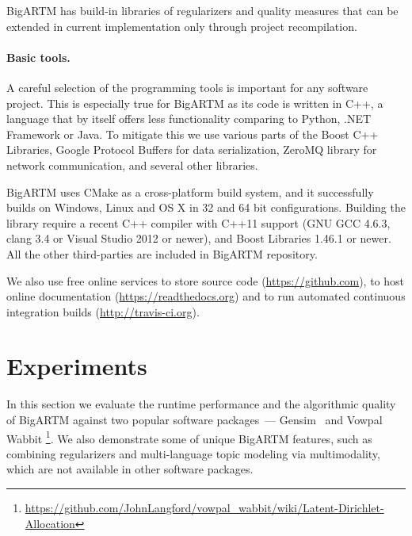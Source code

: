 \documentclass[russian]{llncs}
\begin{document}
BigARTM has build-in libraries of regularizers and quality measures
that can be extended in current implementation only through project recompilation.

\paragraph{Basic tools.}
A careful selection of the programming tools is important for any software project.
This is especially true for BigARTM as its code is written in C++,
a language that by itself offers less functionality comparing to Python, .NET Framework or Java.
To mitigate this we use
various parts of the Boost C++ Libraries,
Google Protocol Buffers for data serialization,
ZeroMQ library for network communication,
and several other libraries.

BigARTM uses CMake as a cross-platform build system,
and it successfully builds on Windows, Linux and OS X in 32 and 64 bit configurations.
Building the library require a recent C++ compiler with C++11 support (GNU GCC 4.6.3, clang 3.4 or Visual Studio 2012 or newer),
and Boost Libraries 1.46.1 or newer. All the other third-parties are included in BigARTM repository.

We also use free online services
to store source code (\url{https://github.com}),
to host online documentation (\url{https://readthedocs.org}) and
to run automated continuous integration builds (\url{http://travis-ci.org}).

\section{Experiments}
\label{sec:Experiments}

In this section we evaluate the runtime performance and the algorithmic quality of \mbox{BigARTM}
against two popular software packages~---
Gensim~\cite{rehurek_lrec}
and Vowpal Wabbit%
\footnote{\url{https://github.com/JohnLangford/vowpal_wabbit/wiki/Latent-Dirichlet-Allocation}}.
We also demonstrate some of unique BigARTM features, such as
combining regularizers and multi-language topic modeling via multimodality,
which are not available in other software packages.
\end{document}
